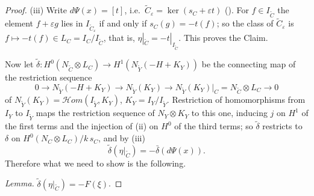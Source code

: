 \documentclass[11pt,twoside]{amsart}
\theoremstyle{plain}
\theoremstyle{definition}
\newcommand{\sHom}{\mathcal{H}om}
\newcommand{\Yt}{\widetilde{Y}}
\newcommand{\Ct}{\widetilde{C}}
\newcommand{\NY}{N_{Y}}
\newcommand{\NYt}{N_{\Yt}}
\begin{document}
\begin{proof}
(iii) Write $d\Psi(x)=[t]$, i.e.\ $\Ct_\varepsilon=\ker(s_C+\varepsilon t)$ (). For $f\in I_{\Ct}$ the element $f+\varepsilon g$ lies in $I_{\Ct_\varepsilon}$ if and only if $s_C(g)=-t(f)$; so the class of $\Ct_\varepsilon$ is $f\mapsto-t(f)\in L_C=I_C/I_{\Ct}$, that is, $\eta|_{\Ct}=-t|_{I_{\Ct}}$. This proves the Claim.

Now let $\tilde\delta\colon H^0(N_{\Ct}\otimes L_C)\to H^1(\NYt(-H+K_Y))$ be the connecting map of the restriction sequence
\[
0\to\NYt(-H+K_Y)\to\NYt(K_Y)\to\NYt(K_Y)|_C=N_{\Ct}\otimes L_C\to0
\]
of $\NYt(K_Y)=\sHom(I_{\Yt},K_Y)$, $K_Y=I_Y/I_{\Yt}$. Restriction of homomorphisms from $I_Y$ to $I_{\Yt}$ maps the restriction sequence of $\NY\otimes K_Y$ to this one, inducing $j$ on $H^1$ of the first terms and the injection of (ii) on $H^0$ of the third terms; so $\tilde\delta$ restricts to $\delta$ on $H^0(N_C\otimes L_C)/k\,s_C$, and by (iii)
\[
\tilde\delta(\eta|_{\Ct})=-\bar\delta(d\Psi(x)) .
\]
Therefore what we need to show is the following.

\emph{Lemma.} $\tilde\delta(\eta|_{\Ct})=-F(\xi)$.


\end{proof}
\end{document}
